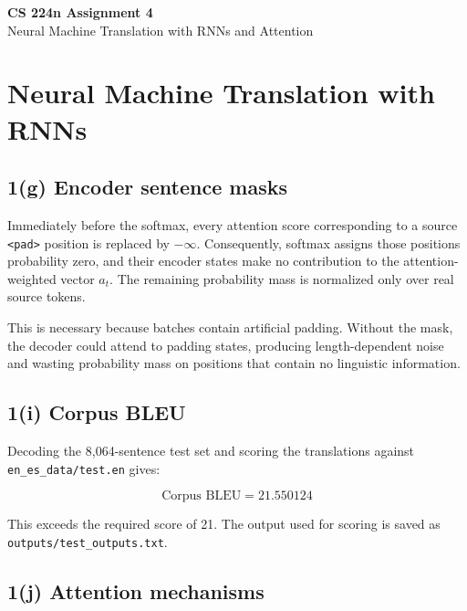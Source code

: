 \documentclass[10pt]{article}
\newcommand{\code}[1]{\texttt{#1}}
\begin{document}
\begin{center}
{\Large\bfseries CS 224n Assignment 4}\\[0.25em]
{\large Neural Machine Translation with RNNs and Attention}
\end{center}
\vspace{0.35em}

\section{Neural Machine Translation with RNNs}

\subsection*{1(g) Encoder sentence masks}

Immediately before the softmax, every attention score corresponding to a source \code{<pad>} position is replaced by $-\infty$. Consequently, softmax assigns those positions probability zero, and their encoder states make no contribution to the attention-weighted vector $a_t$. The remaining probability mass is normalized only over real source tokens.

This is necessary because batches contain artificial padding. Without the mask, the decoder could attend to padding states, producing length-dependent noise and wasting probability mass on positions that contain no linguistic information.

\subsection*{1(i) Corpus BLEU}

Decoding the 8,064-sentence test set and scoring the translations against \code{en\_es\_data/test.en} gives:

\[
\boxed{\text{Corpus BLEU} = 21.550124}
\]

This exceeds the required score of 21. The output used for scoring is saved as \code{outputs/test\_outputs.txt}.

\subsection*{1(j) Attention mechanisms}
\end{document}

